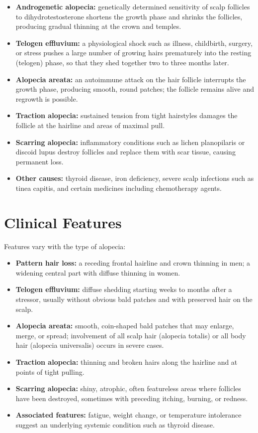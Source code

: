 \begin{itemize}
    \item \textbf{Androgenetic alopecia:} genetically determined sensitivity of scalp follicles to dihydrotestosterone shortens the growth phase and shrinks the follicles, producing gradual thinning at the crown and temples.
    \item \textbf{Telogen effluvium:} a physiological shock such as illness, childbirth, surgery, or stress pushes a large number of growing hairs prematurely into the resting (telogen) phase, so that they shed together two to three months later.
    \item \textbf{Alopecia areata:} an autoimmune attack on the hair follicle interrupts the growth phase, producing smooth, round patches; the follicle remains alive and regrowth is possible.
    \item \textbf{Traction alopecia:} sustained tension from tight hairstyles damages the follicle at the hairline and areas of maximal pull.
    \item \textbf{Scarring alopecia:} inflammatory conditions such as lichen planopilaris or discoid lupus destroy follicles and replace them with scar tissue, causing permanent loss.
    \item \textbf{Other causes:} thyroid disease, iron deficiency, severe scalp infections such as tinea capitis, and certain medicines including chemotherapy agents.
\end{itemize}

\section*{Clinical Features}
Features vary with the type of alopecia:

\begin{itemize}
    \item \textbf{Pattern hair loss:} a receding frontal hairline and crown thinning in men; a widening central part with diffuse thinning in women.
    \item \textbf{Telogen effluvium:} diffuse shedding starting weeks to months after a stressor, usually without obvious bald patches and with preserved hair on the scalp.
    \item \textbf{Alopecia areata:} smooth, coin-shaped bald patches that may enlarge, merge, or spread; involvement of all scalp hair (alopecia totalis) or all body hair (alopecia universalis) occurs in severe cases.
    \item \textbf{Traction alopecia:} thinning and broken hairs along the hairline and at points of tight pulling.
    \item \textbf{Scarring alopecia:} shiny, atrophic, often featureless areas where follicles have been destroyed, sometimes with preceding itching, burning, or redness.
    \item \textbf{Associated features:} fatigue, weight change, or temperature intolerance suggest an underlying systemic condition such as thyroid disease.
\end{itemize}

